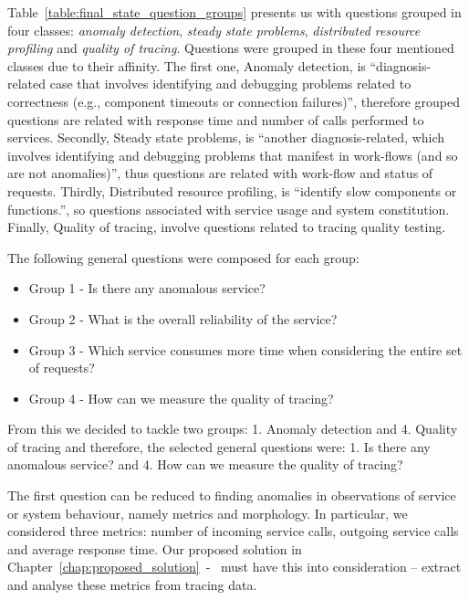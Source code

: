 Table~\ref{table:final_state_question_groups} presents us with questions grouped in four classes: \emph{anomaly detection}, \emph{steady state problems}, \emph{distributed resource profiling} and \emph{quality of tracing}. Questions were grouped in these four mentioned classes due to their affinity. The first one, Anomaly detection, is ``diagnosis-related case that involves identifying and debugging problems related to correctness (e.g., component timeouts or connection failures)'', therefore grouped questions are related with response time and number of calls performed to services. Secondly, Steady state problems, is ``another diagnosis-related, which involves identifying
and debugging problems that manifest in work-flows (and so are not anomalies)'', thus questions are related with work-flow and status of requests. Thirdly, Distributed resource profiling, is ``identify slow components or functions.'', so questions associated with service usage and system constitution. Finally, Quality of tracing, involve questions related to tracing quality testing.

The following general questions were composed for each group:

\begin{itemize}
    \item Group 1 - Is there any anomalous service?
    \item Group 2 - What is the overall reliability of the service?
    \item Group 3 - Which service consumes more time when considering the entire set of requests?
    \item Group 4 - How can we measure the quality of tracing?
\end{itemize}

From this we decided to tackle two groups: 1. Anomaly detection and 4. Quality of tracing and therefore, the selected general questions were: 1. Is there any anomalous service? and 4. How can we measure the quality of tracing?

The first question can be reduced to finding anomalies in observations of service or system behaviour, namely metrics and morphology.
In particular, we considered three metrics: number of incoming service calls, outgoing service calls and average response time. Our proposed solution in Chapter~\ref{chap:proposed_solution}~-~ must have this into consideration -- extract and analyse these metrics from tracing data.

